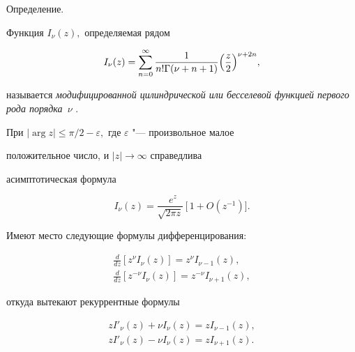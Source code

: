 {\small\sc Определение.}

Функция $I_{\nu}(z),$ определяемая рядом 

\begin{equation}\label{I_{nu}(z)}

I_{\nu}(z)=\sum\limits_{n=0}^{\infty}\frac{1}{n! \Gamma(\nu+n+1)}

\Bigl(\frac{z}{2} \Bigr)^{\nu+2n}, 

\end{equation}

называется {\it модифицированной цилиндрической или бесселевой функцией первого рода порядка~$\nu$}  \cite{Kuzn, BatemanErdelyi}.



\smallskip



При $|\arg{z}|\leqslant {\pi}/{2} -\varepsilon,$  где $\varepsilon$ "--- произвольное малое 

положительное число, и $|z|\to \infty$ справедлива 

асимптотическая формула

\begin{equation}\label{AsimptI}

I_{\nu}(z)= \frac{\;\;e^{z}}{\sqrt{2\pi z}} 

\,\big[ \,1+O\left(z^{-1}\right)\big].

\end{equation}





Имеют место следующие  формулы дифференцирования:

\begin{gather}\label{Iz}

\frac{d}{dz}\left[z^{\nu}I_{\nu}(z)\right]=

z^{\nu}I_{\nu-1}(z),

\\

\label{Iz^-1}

\frac{d}{dz}\left[z^{-\nu}I_{\nu}(z)\right]=

z^{-\nu}I_{\nu+1}(z),

\end{gather}

откуда вытекают  рекуррентные формулы

\begin{gather}

\label{I_(nu-1)(z)}

z I'_{\nu}(z)+\nu I_{\nu}(z)=z I_{\nu-1}(z),

\\

\label{I_(nu+1)(z)}

z I'_{\nu}(z)-\nu I_{\nu}(z)=z I_{\nu+1}(z).

\end{gather}



